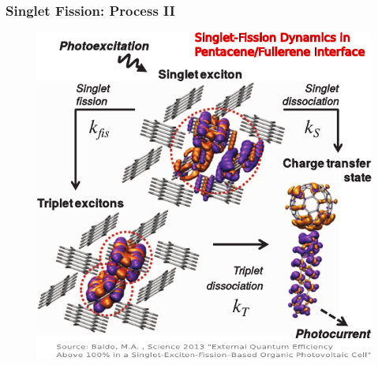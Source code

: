 \documentclass[compress]{beamer}
\begin{document}
\begin{frame}
\frametitle{Singlet Fission: Process II}

\begin{figure}[H]
\includegraphics[width=0.7\columnwidth]{../img/SF_esq18.pdf}
\end{figure}

\end{frame}
\end{document}
